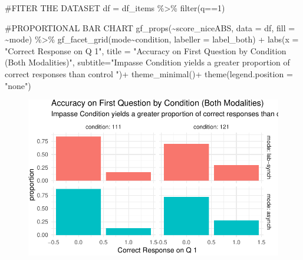 \documentclass[
  letterpaper,
  DIV=11,
  numbers=noendperiod]{scrreprt}
\newenvironment{Shaded}{\begin{snugshade}}{\end{snugshade}}
\newcommand{\AttributeTok}[1]{\textcolor[rgb]{0.40,0.45,0.13}{#1}}
\newcommand{\CommentTok}[1]{\textcolor[rgb]{0.37,0.37,0.37}{#1}}
\newcommand{\DecValTok}[1]{\textcolor[rgb]{0.68,0.00,0.00}{#1}}
\newcommand{\FunctionTok}[1]{\textcolor[rgb]{0.28,0.35,0.67}{#1}}
\newcommand{\NormalTok}[1]{\textcolor[rgb]{0.00,0.23,0.31}{#1}}
\newcommand{\OtherTok}[1]{\textcolor[rgb]{0.00,0.23,0.31}{#1}}
\newcommand{\SpecialCharTok}[1]{\textcolor[rgb]{0.37,0.37,0.37}{#1}}
\newcommand{\StringTok}[1]{\textcolor[rgb]{0.13,0.47,0.30}{#1}}
\begin{document}
\begin{Shaded}
\begin{Highlighting}[]
\CommentTok{\#FITER THE DATASET}
\NormalTok{df }\OtherTok{=}\NormalTok{ df\_items }\SpecialCharTok{\%\textgreater{}\%} \FunctionTok{filter}\NormalTok{(q}\SpecialCharTok{==}\DecValTok{1}\NormalTok{) }

\CommentTok{\#PROPORTIONAL BAR CHART}
\FunctionTok{gf\_props}\NormalTok{(}\SpecialCharTok{\textasciitilde{}}\NormalTok{score\_niceABS, }\AttributeTok{data =}\NormalTok{ df, }\AttributeTok{fill =} \SpecialCharTok{\textasciitilde{}}\NormalTok{mode) }\SpecialCharTok{\%\textgreater{}\%} 
  \FunctionTok{gf\_facet\_grid}\NormalTok{(mode}\SpecialCharTok{\textasciitilde{}}\NormalTok{condition, }\AttributeTok{labeller =}\NormalTok{ label\_both) }\SpecialCharTok{+}
  \FunctionTok{labs}\NormalTok{(}\AttributeTok{x =} \StringTok{"Correct Response on Q 1"}\NormalTok{,}
       \AttributeTok{title =} \StringTok{"Accuracy on First Question by Condition (Both Modalities)"}\NormalTok{,}
       \AttributeTok{subtitle=}\StringTok{"Impasse Condition yields a greater proportion of correct responses than control "}\NormalTok{)}\SpecialCharTok{+}
  \FunctionTok{theme\_minimal}\NormalTok{()}\SpecialCharTok{+} \FunctionTok{theme}\NormalTok{(}\AttributeTok{legend.position =} \StringTok{"none"}\NormalTok{)}
\end{Highlighting}
\end{Shaded}

\begin{figure}[H]

{\centering \includegraphics{analysis/SGC3A/5_sgc3A_exploration_files/figure-pdf/VIS-LR-Q1.tri.by.Cond-1.pdf}

}

\end{figure}
\end{document}

